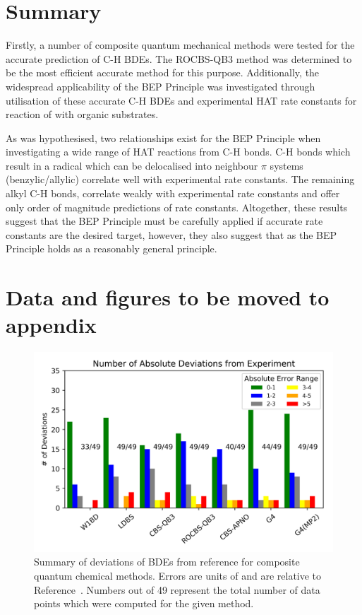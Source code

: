 
\section{Summary}

Firstly, a number of composite quantum mechanical methods were tested for the accurate prediction of C-H BDEs. The ROCBS-QB3 method was determined to be the most efficient accurate method for this purpose. Additionally, the widespread applicability of the BEP Principle was investigated through utilisation of these accurate C-H BDEs and experimental HAT rate constants for reaction of \cumo with organic substrates.

As was hypothesised, two relationships exist for the BEP Principle when investigating a wide range of HAT reactions from C-H bonds. C-H bonds which result in a radical which can be delocalised into neighbour $\pi$ systems (benzylic/allylic) correlate well with experimental rate constants. The remaining alkyl C-H bonds, correlate weakly with experimental rate constants and offer only order of magnitude predictions of rate constants. Altogether, these results suggest that the BEP Principle must be carefully applied if accurate rate constants are the desired target, however, they also suggest that as the BEP Principle holds as a reasonably general principle.

\newpage
\section{Data and figures to be moved to appendix}
\begin{figure}[htb]
  \centering
  \includegraphics[width=\textwidth]{figures/bde-barchart}
  \caption[Summary of deviations of BDEs from reference for composite quantum chemical methods.]{Summary of deviations of BDEs from reference for composite quantum chemical methods. Errors are units of \kcalmol and are relative to Reference~\protect{}. Numbers out of 49 represent the total number of data points which were computed for the given method.}
\end{figure}

